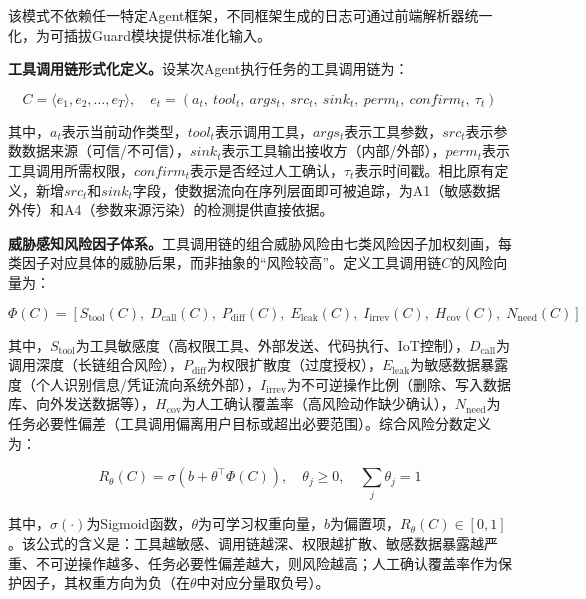 该模式不依赖任一特定Agent框架，不同框架生成的日志可通过前端解析器统一化，为可插拔Guard模块提供标准化输入。

\textbf{工具调用链形式化定义。}设某次Agent执行任务的工具调用链为：

\begin{equation}
  C = \langle e_1, e_2, \ldots, e_T \rangle, \quad e_t = (a_t,\ tool_t,\ args_t,\ src_t,\ sink_t,\ perm_t,\ confirm_t,\ \tau_t)
\end{equation}

其中，$a_t$表示当前动作类型，$tool_t$表示调用工具，$args_t$表示工具参数，$src_t$表示参数数据来源（可信/不可信），$sink_t$表示工具输出接收方（内部/外部），$perm_t$表示工具调用所需权限，$confirm_t$表示是否经过人工确认，$\tau_t$表示时间戳。相比原有定义，新增$src_t$和$sink_t$字段，使数据流向在序列层面即可被追踪，为A1（敏感数据外传）和A4（参数来源污染）的检测提供直接依据。

\textbf{威胁感知风险因子体系。}工具调用链的组合威胁风险由七类风险因子加权刻画，每类因子对应具体的威胁后果，而非抽象的“风险较高”。定义工具调用链$C$的风险向量为：

\begin{equation}
  \Phi(C) = \left[S_{\text{tool}}(C),\; D_{\text{call}}(C),\; P_{\text{diff}}(C),\; E_{\text{leak}}(C),\; I_{\text{irrev}}(C),\; H_{\text{cov}}(C),\; N_{\text{need}}(C)\right]
\end{equation}

其中，$S_{\text{tool}}$为工具敏感度（高权限工具、外部发送、代码执行、IoT控制），$D_{\text{call}}$为调用深度（长链组合风险），$P_{\text{diff}}$为权限扩散度（过度授权），$E_{\text{leak}}$为敏感数据暴露度（个人识别信息/凭证流向系统外部），$I_{\text{irrev}}$为不可逆操作比例（删除、写入数据库、向外发送数据等），$H_{\text{cov}}$为人工确认覆盖率（高风险动作缺少确认），$N_{\text{need}}$为任务必要性偏差（工具调用偏离用户目标或超出必要范围）。综合风险分数定义为：

\begin{equation}
  R_\theta(C) = \sigma\!\left(b + \theta^\top \Phi(C)\right), \quad \theta_j \geq 0,\quad \sum_j \theta_j = 1
  \label{eq:risk_score}
\end{equation}

其中，$\sigma(\cdot)$为Sigmoid函数，$\theta$为可学习权重向量，$b$为偏置项，$R_\theta(C) \in [0,1]$。该公式的含义是：工具越敏感、调用链越深、权限越扩散、敏感数据暴露越严重、不可逆操作越多、任务必要性偏差越大，则风险越高；人工确认覆盖率作为保护因子，其权重方向为负（在$\theta$中对应分量取负号）。

